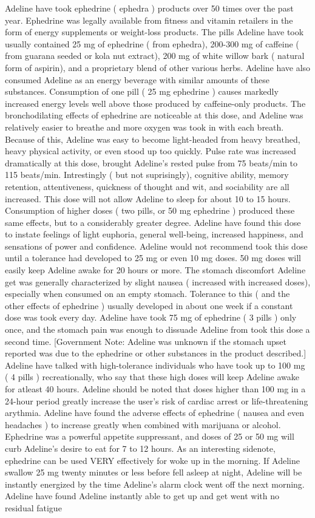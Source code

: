\documentclass[12pt]{book}
\begin{document}
Adeline have took ephedrine ( ephedra ) products over 50 times over the past year. Ephedrine was legally available from fitness and vitamin retailers in the form of energy supplements or weight-loss products. The pills Adeline have took usually contained 25 mg of ephedrine ( from ephedra), 200-300 mg of caffeine ( from guarana seeded or kola nut extract), 200 mg of white willow bark ( natural form of aspirin), and a proprietary blend of other various herbs. Adeline have also consumed Adeline as an energy beverage with similar amounts of these substances. Consumption of one pill ( 25 mg ephedrine ) causes markedly increased energy levels well above those produced by caffeine-only products. The bronchodilating effects of ephedrine are noticeable at this dose, and Adeline was relatively easier to breathe and more oxygen was took in with each breath. Because of this, Adeline was easy to become light-headed from heavy breathed, heavy physical activity, or even stood up too quickly. Pulse rate was increased dramatically at this dose, brought Adeline's rested pulse from 75 beats/min to 115 beats/min. Intrestingly ( but not suprisingly), cognitive ability, memory retention, attentiveness, quickness of thought and wit, and sociability are all increased. This dose will not allow Adeline to sleep for about 10 to 15 hours. Consumption of higher doses ( two pills, or 50 mg ephedrine ) produced these same effects, but to a considerably greater degree. Adeline have found this dose to instate feelings of light euphoria, general well-being, increased happiness, and sensations of power and confidence. Adeline would not recommend took this dose until a tolerance had developed to 25 mg or even 10 mg doses. 50 mg doses will easily keep Adeline awake for 20 hours or more. The stomach discomfort Adeline get was generally characterized by slight nausea ( increased with increased doses), especially when consumed on an empty stomach. Tolerance to this ( and the other effects of ephedrine ) usually developed in about one week if a constant dose was took every day. Adeline have took 75 mg of ephedrine ( 3 pills ) only once, and the stomach pain was enough to dissuade Adeline from took this dose a second time. [Government Note: Adeline was unknown if the stomach upset reported was due to the ephedrine or other substances in the product described.] Adeline have talked with high-tolerance individuals who have took up to 100 mg ( 4 pills ) recreationally, who say that these high doses will keep Adeline awake for atleast 40 hours. Adeline should be noted that doses higher than 100 mg in a 24-hour period greatly increase the user's risk of cardiac arrest or life-threatening arythmia. Adeline have found the adverse effects of ephedrine ( nausea and even headaches ) to increase greatly when combined with marijuana or alcohol. Ephedrine was a powerful appetite suppressant, and doses of 25 or 50 mg will curb Adeline's desire to eat for 7 to 12 hours. As an interesting sidenote, ephedrine can be used VERY effectively for woke up in the morning. If Adeline swallow 25 mg twenty minutes or less before fell asleep at night, Adeline will be instantly energized by the time Adeline's alarm clock went off the next morning. Adeline have found Adeline instantly able to get up and get went with no residual fatigue 
\end{document}
